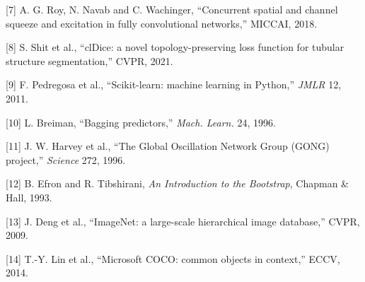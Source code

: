 {[}7{]} A. G. Roy, N. Navab and C. Wachinger, ``Concurrent spatial and channel squeeze and excitation in fully convolutional networks,'' MICCAI, 2018.

{[}8{]} S. Shit et al., ``clDice: a novel topology-preserving loss function for tubular structure segmentation,'' CVPR, 2021.

{[}9{]} F. Pedregosa et al., ``Scikit-learn: machine learning in Python,'' \emph{JMLR} 12, 2011.

{[}10{]} L. Breiman, ``Bagging predictors,'' \emph{Mach. Learn.} 24, 1996.

{[}11{]} J. W. Harvey et al., ``The Global Oscillation Network Group (GONG) project,'' \emph{Science} 272, 1996.

{[}12{]} B. Efron and R. Tibshirani, \emph{An Introduction to the Bootstrap}, Chapman \& Hall, 1993.

{[}13{]} J. Deng et al., ``ImageNet: a large-scale hierarchical image database,'' CVPR, 2009.

{[}14{]} T.-Y. Lin et al., ``Microsoft COCO: common objects in context,'' ECCV, 2014.
